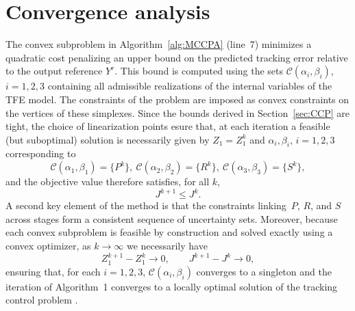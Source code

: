 \documentclass{ifacconf}
\begin{document}
\section{Convergence analysis}\label{sec:converge}
%
%
The convex subproblem in Algorithm~\ref{alg:MCCPA} (line~7) minimizes a quadratic cost penalizing an upper bound on the predicted tracking error relative to the output reference $Y^r$. This bound is computed using the sets $\mathcal{C}(\alpha_i,\beta_i)$, $i=1,2,3$ containing all admissible realizations of the internal variables of the TFE model. 
The constraints of the problem are imposed as convex constraints on the vertices of these simplexes.
Since the bounds derived in Section~\ref{sec:CCP} are tight, the choice of linearization points esure that, at each iteration a feasible (but suboptimal) solution is necessarily given by
$Z_1 = Z_1^k$ and $\alpha_i,\beta_i$, $i=1,2,3$ corresponding to
\[
\mathcal{C}(\alpha_1,\beta_1) = \{P^k\}, \
\mathcal{C}(\alpha_2,\beta_2) = \{R^k\}, \
\mathcal{C}(\alpha_3,\beta_3) = \{S^k\},
\]
and the objective value therefore satisfies, for all $k$,
\[
  J^{k+1} \leq J^{k}.
\]
A second key element of the method is that the constraints linking~$P$, $R$, and $S$ across stages form a consistent sequence of uncertainty sets. Moreover, because each convex subproblem is feasible by construction and solved exactly using a convex optimizer, as $k\to\infty$ we necessarily have
\[
  Z_1^{k+1} - Z_1^{k} \to 0,
  \qquad
  J^{k+1} - J^{k} \to 0,
\]
ensuring that, for each $i=1,2,3$, $\mathcal{C}(\alpha_i,\beta_i)$ converges to a singleton 
and the iteration of Algorithm~1 converges to a locally optimal solution of the tracking control problem \citep[see e.g.][Theorems 2 and 3]{ju_1}.
\end{document}
